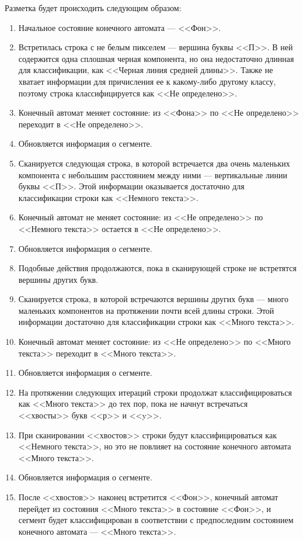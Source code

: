 Разметка будет происходить следующим образом:
\begin{enumerate}
    \item Начальное состояние конечного автомата --- <<Фон>>.
    \item Встретилась строка с не белым пикселем --- вершина буквы <<П>>.
        В ней содержится одна сплошная черная компонента, но она недостаточно длинная для классификации, как <<Черная линия средней длины>>.
        Также не хватает информации для причисления ее к какому-либо другому классу, поэтому строка классифицируется как <<Не определено>>.
    \item Конечный автомат меняет состояние: из <<Фона>> по <<Не определено>> переходит в <<Не определено>>.
    \item Обновляется информация о сегменте.
    \item Сканируется следующая строка, в которой встречается два очень маленьких компонента с небольшим расстоянием между ними --- вертикальные линии буквы <<П>>.
    Этой информации оказывается достаточно для классификации строки как <<Немного текста>>.
    \item Конечный автомат не меняет состояние: из <<Не определено>> по <<Немного текста>> остается в <<Не определено>>.
    \item Обновляется информация о сегменте.
    \item Подобные действия продолжаются, пока в сканирующей строке не встретятся вершины других букв.
    \item Сканируется строка, в которой встречаются вершины других букв --- много маленьких компонентов на протяжении почти всей длины строки.
    Этой информации достаточно для классификации строки как <<Много текста>>.
    \item Конечный автомат меняет состояние: из <<Не определено>> по <<Много текста>> переходит в <<Много текста>>.
    \item Обновляется информация о сегменте.
    \item На протяжении следующих итераций строки продолжат классифицироваться как <<Много текста>> до тех пор, пока не начнут встречаться <<хвосты>> букв <<р>> и <<y>>.
    \item При сканировании <<хвостов>> строки будут классифицироваться как <<Немного текста>>, но это не повлияет на состояние конечного автомата <<Много текста>>.
    \item Обновляется информация о сегменте.
    \item После <<хвостов>> наконец встретится <<Фон>>, конечный автомат перейдет из состояния <<Много текста>> в состояние <<Фон>>, и сегмент будет классифицирован в соответствии с предпоследним состоянием конечного автомата --- <<Много текста>>.
\end{enumerate}

